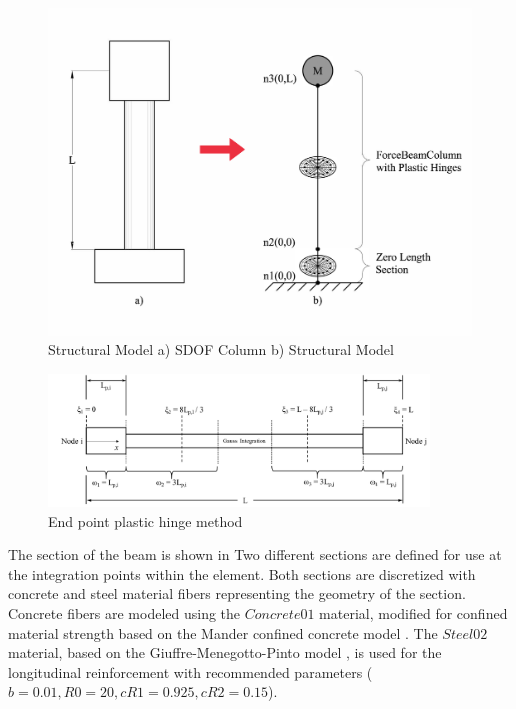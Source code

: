 \begin{figure}[htbp]
	\centering
	\includegraphics[width=1.0\textwidth]{Chapter-5/figs/StructuralModel_01}
	\caption{Structural Model a) SDOF Column b) Structural Model}
	\label{fig:Structural_Model}
\end{figure}

\begin{figure}[htbp]
	\centering
	\includegraphics[width=0.9\textwidth]{Chapter-5/figs/fbc_PlasticHinge}
	\caption{End point plastic hinge method \cite{Scott}}
	\label{fig:Fiber_PlasticHinge}
\end{figure}

The section of the beam is shown in  Two different sections are defined for use at the integration points within the element. Both sections are discretized with concrete and steel material fibers representing the geometry of the section. Concrete fibers are modeled using the $Concrete01$ material, modified for confined material strength based on the Mander confined concrete model \cite{Mander1988}. The $Steel02$ material, based on the Giuffre-Menegotto-Pinto model \cite{Filippou1983}, is used for the longitudinal reinforcement with recommended parameters ($b = 0.01, R0 = 20, cR1 = 0.925, cR2 = 0.15$). 

